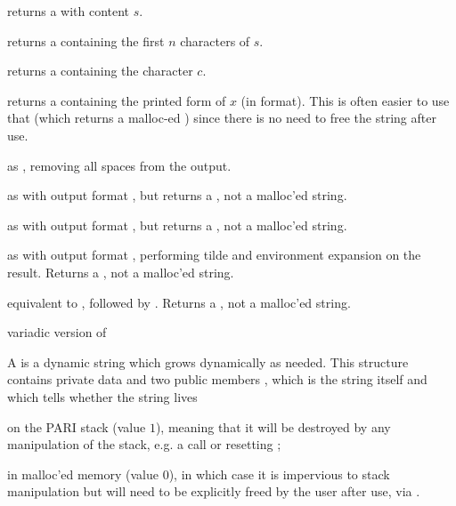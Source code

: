 
 returns a  with content $s$.

returns a  containing the first $n$ characters of $s$.

 returns a  containing the character
$c$.

 returns a  containing the printed
form of $x$ (in  format). This is often easier to use that
 (which returns a malloc-ed ) since there is no need
to free the string after use.

 as , removing all
spaces from the output.

 as  with output format ,
but returns a , not a malloc'ed string.

 as  with output format ,
but returns a , not a malloc'ed string.

 as  with output format ,
performing tilde and environment expansion on the result. Returns a
, not a malloc'ed string.

 equivalent to
, followed by . Returns a ,
not a malloc'ed string.

 variadic version of


A  is a dynamic string which grows dynamically as needed.
This structure contains private data and two public members ,
which is the string itself and  which tells whether the
string lives

\item on the PARI stack (value $1$), meaning that it will be destroyed by any
manipulation of the stack, e.g. a  call or resetting
;

\item in malloc'ed memory (value $0$), in which case it is impervious to
stack manipulation but will need to be explicitly freed by the user
after use, via .


